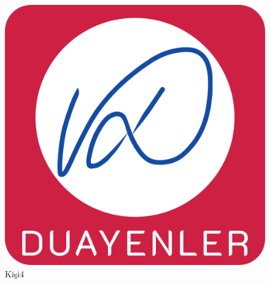 \begin{minipage}{0.8\textwidth}
\begin{flushleft} 

\blindtext


\end{flushleft}
\end{minipage}
\begin{minipage}{0.28\textwidth}
\begin{flushright}
 
\begin{figure}[H]
\center
\setlength{\unitlength}{\textwidth} 
\includegraphics[width=0.7\unitlength]{images/logo1}
\caption{\label{fig:kisi4}Kişi4 }
\end{figure}

\end{flushright}
\end{minipage}\\[0.8cm]




